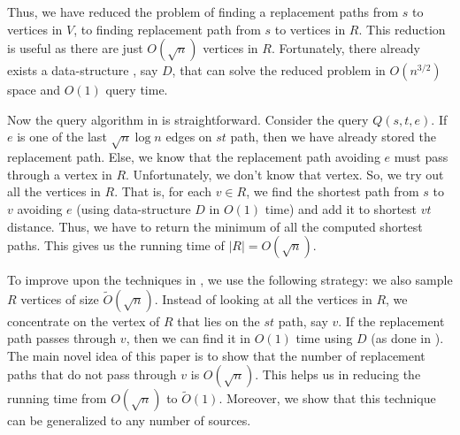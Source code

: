Thus, we have reduced the problem of finding a replacement
paths from $s$ to vertices in $V$,
to finding replacement path from $s$ to vertices in $R$.
This reduction is useful as
there are just $ O(\sqrt n)$ vertices in $R$. Fortunately,
there already exists a
data-structure \cite{DemetrescuTCR08}, say $D$, that can
solve the reduced
problem in $O(n^{3/2})$ space and $O(1)$ query time.

Now the query algorithm in  \cite{BiloCGLP17} is straightforward.
Consider the query $Q(s,t,e)$.
If $e$ is one of  the last $\sqrt n \log n$ edges on $st$
path, then we have already stored
the replacement path.
Else, we know that the replacement path avoiding $e$ must
pass through a vertex in $R$. Unfortunately,
we don't know that vertex. So, we try out all the vertices
in $R$. That is, for each $v \in R$,
we find the shortest path from $s$ to $v$ avoiding $e$ (using
data-structure $D$ in $O(1)$ time)
and add it to shortest $vt$ distance. Thus, we have to return
the minimum of all the computed
shortest paths. This gives us the running time of $|R| =
 O(\sqrt n)$.

 To improve upon the techniques in \cite{BiloCGLP17}, we
use the following
strategy: we also sample $R$ vertices of size $\tilde O(\sqrt
n)$. Instead of looking at all
the vertices in $R$, we concentrate on the vertex of $R$
that lies on the $st$ path, say $v$.
If the replacement path passes through $v$, then we can
 find it in $O(1)$ time using $D$ (as done in \cite{BiloCGLP17}).
The main novel idea of this paper is to show that the number
of replacement paths that do not
pass through $v$ is $O(\sqrt n)$. This helps us in reducing
the running time from $O(\sqrt n)$
to $\tilde O(1)$. Moreover, we show that this technique
can be generalized to any number of sources.
\fi
